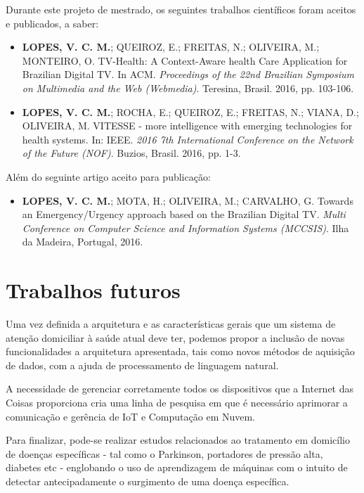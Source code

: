 Durante este projeto de mestrado, os seguintes trabalhos científicos foram
aceitos e publicados, a saber:

\begin{itemize}
  \item \textbf{LOPES, V. C. M.}; QUEIROZ, E.; FREITAS, N.; OLIVEIRA, M.; MONTEIRO, O. TV-Health:
  A Context-Aware health Care Application for Brazilian Digital TV. In ACM.
  \textit{Proceedings of the 22nd Brazilian Symposium on Multimedia and the Web (Webmedia)}. 
  Teresina, Brasil. 2016, pp. 103-106.

  \item \textbf{LOPES, V. C. M.}; ROCHA, E.; QUEIROZ, E.; FREITAS, N.; VIANA, D.; OLIVEIRA, M. VITESSE 
  - more intelligence with emerging technologies for health systems. In: IEEE. 
  \textit{2016 7th International Conference on the Network of the Future (NOF)}. Buzios, Brasil. 2016, pp. 1-3.
\end{itemize}

Além do seguinte artigo aceito para publicação:

\begin{itemize}
  \item \textbf{LOPES, V. C. M.}; MOTA, H.; OLIVEIRA, M.; CARVALHO, G. Towards an Emergency/Urgency
    approach based on the Brazilian Digital TV. \textit{Multi Conference on Computer Science 
    and Information Systems (MCCSIS)}. Ilha da Madeira, Portugal, 2016.
\end{itemize}

\section{Trabalhos futuros} \label{sec:trabalhos-futuros}

Uma vez definida a arquitetura e as características gerais que um sistema de
atenção domiciliar à saúde atual deve ter, podemos propor a inclusão de
novas funcionalidades a arquitetura apresentada, tais como novos métodos
de aquisição de dados, com a ajuda de processamento de linguagem natural.

A necessidade de gerenciar corretamente todos os dispositivos que a Internet
das Coisas proporciona cria uma linha de pesquisa em que é necessário aprimorar
a comunicação e gerência de IoT e Computação em Nuvem.

Para finalizar, pode-se realizar estudos relacionados ao tratamento em domicílio de
doenças específicas - tal como o Parkinson, portadores de pressão alta,
diabetes etc - englobando o uso de aprendizagem de máquinas com o intuito de detectar
antecipadamente o surgimento de uma doença específica.
